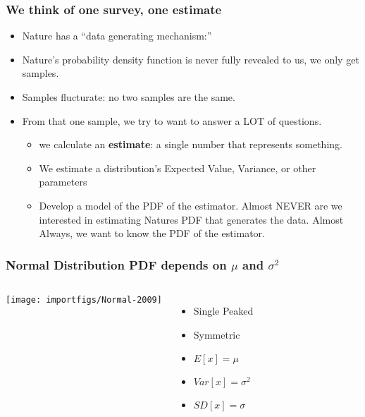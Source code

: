 \documentclass[10pt,english]{beamer}
\begin{document}
\begin{frame}
  \frametitle{We think of one survey, one estimate}

  \begin{itemize}
  \item Nature has a ``data generating
    mechanism:''
  \item Nature's probability density function is never fully
    revealed to us, we only get samples.
  \item Samples flucturate: no two
    samples are the same.
  \item From that one sample, we try to
    want to answer a LOT of questions.
    \begin{itemize}
    \item we calculate an \textbf{estimate}: a single
      number that represents something.
    \item We estimate a distribution's Expected Value, Variance,
      or other parameters
    \item Develop a model of the PDF of the estimator.  Almost NEVER
      are we interested in estimating Natures PDF that generates the
      data. Almost Always, we want to know the PDF of the estimator.
    \end{itemize}
  \end{itemize}
\end{frame}


\begin{frame}
  \frametitle{Normal Distribution PDF depends on $\mu$ and $\sigma^2$}
  \begin{columns}%

    \column{8cm}

    \texttt{[image: importfigs/Normal-2009]}

    \column{4cm}

    \begin{itemize}
    \item Single Peaked
    \item Symmetric
    \item $E[x]=\mu$
    \item $Var[x]=\sigma^{2}$
    \item $SD[x]=\sigma$
    \end{itemize}
\end{columns}

\end{frame}
\end{document}
